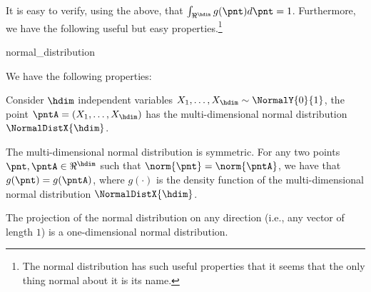 \medskip

It is easy to verify, using the above, that $\int_{\Re^\hdim} g(\pnt)
d\pnt = 1$. Furthermore, we have the following useful but easy
properties.\footnote{The normal distribution has such useful
   properties that it seems that the only thing normal about it is its
   name.}

\begin{fragment}{normal_distribution}
\begin{lemma}    
    We have the following properties:
    \begin{compactenumA}

        \smallskip%
        \item Consider $\hdim$ independent variables
        $X_1, \ldots, X_\hdim \sim \NormalY{0}{1}$, the point
        $\pntA = (X_1, \ldots, X_\hdim)$ has the multi-dimensional
        normal distribution $\NormalDistX{\hdim}$.

        \smallskip%
        \item The multi-dimensional normal distribution is
        symmetric. For any two points $\pnt, \pntA \in \Re^\hdim$ such
        that $\norm{ \pnt} = \norm{\pntA}$, we have that
        $g(\pnt) = g(\pntA)$, where $g(\cdot)$ is the density function
        of the multi-dimensional normal distribution
        $\NormalDistX{\hdim}$.

        \smallskip%
        \item The projection of the normal distribution on any
        direction (i.e., any vector of length $1$) is a
        one-dimensional normal distribution.
    \end{compactenumA}
\end{lemma} 
\end{fragment}
